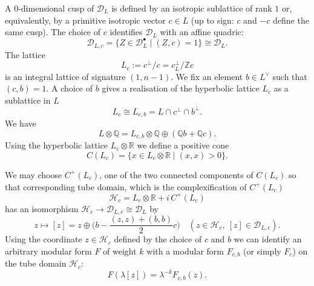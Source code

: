\documentclass[a4paper,11pt]{article}
\newcommand{\QQ}{\mathbb Q}
\newcommand{\RR}{\mathbb R}
\newcommand{\ZZ}{\mathbb Z}
\renewcommand{\cD}{\mathcal D}
\renewcommand{\cH}{\mathcal H}
\begin{document}
A $0$-dimensional cusp of $\cD_L$ is defined by an isotropic
sublattice of rank $1$ or, equivalently, by a primitive isotropic
vector $c\in L$ (up to sign: $c$ and $-c$ define the same cusp). The
choice of $c$ identifies $\cD_L$ with an affine quadric:
\begin{equation*}
\cD_{L,c}=\{Z\in \cD_L^\bullet \mid (Z,c)=1\}\cong \cD_L.
\end{equation*}
The lattice
\begin{equation}
L_c:=c^\perp/c= c^\perp_L/\ZZ c
\end{equation}
is an integral lattice of signature $(1,n-1)$.  We fix an element
$b\in L^\vee$ such that $(c,b)=1$. A choice of $b$ gives a realisation
of the hyperbolic lattice $L_c$ as a sublattice in $L$
\begin{equation}
L_{c}\cong L_{c,b}=L\cap c^\perp\cap b^\perp.
\end{equation}
We have
\begin{equation*}
L\otimes \QQ=L_{c,b}\otimes \QQ\oplus (\QQ b+\QQ c).
\end{equation*}
Using the hyperbolic lattice $L_c\otimes \RR$ we define a positive cone
\begin{equation*}
C(L_c)=\{x\in L_c\otimes \RR\mid (x,x)>0\}.
\end{equation*}

We may choose $C^+(L_c)$, one of the two connected components of
$C(L_c)$ so that corresponding tube domain, which is  the  complexification
of $C^+(L_c)$
\begin{equation*}
\cH_c=L_c\otimes \RR+i\, C^+(L_c)
\end{equation*}
has an isomorphism $\cH_c\to \cD_{L,c}\cong \cD_L$ by
\begin{equation}\label{affine-z}
z\mapsto [z]= z\oplus\big(b-\frac {(z,z)+(b,b)}{2}c\big)\quad
(z\in \cH_c,\ [z]\in \cD_{L,c}).
\end{equation}
Using the coordinate $z\in \cH_c$ defined by the choice of $c$ and $b$
we can identify an arbitrary modular form $F$ of weight $k$ with a modular form
$F_{c,b}$ (or simply $F_c$) on the tube domain $\cH_c$:
\begin{equation*}
F(\lambda [z])=\lambda^{-k} F_{c,b}(z).
\end{equation*}
\end{document}
